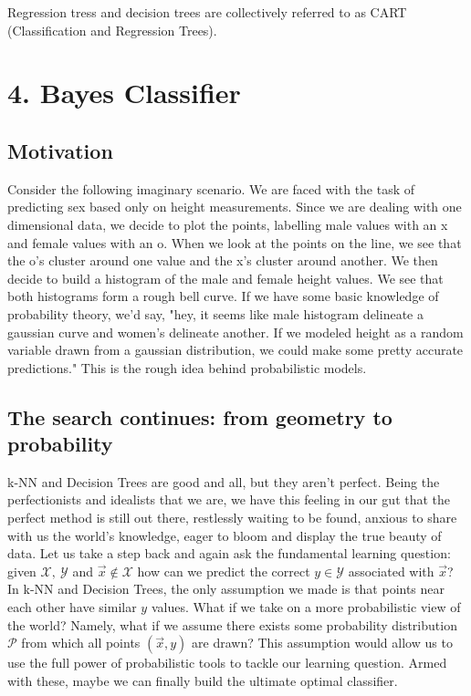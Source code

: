 \documentclass[10pt]{article}
\begin{document}
		\noindent Regression tress and decision trees are collectively referred to as CART 
		(Classification and Regression Trees).
		
		
\section*{4. Bayes Classifier}
	\subsection*{Motivation}
		Consider the following imaginary scenario. We are faced with the task of predicting sex based only on height 
		measurements. Since we are dealing with one dimensional data, we decide to plot the points, labelling male 
		values with an x and female values with an o. When we look at the points on the line, we see that the o's cluster 
		around one value and the x's cluster around another. We then decide to build a histogram of the male and 
		female height values. We see that both histograms form a rough bell curve. If we have some basic knowledge 
		of probability theory, we'd say, "hey, it seems like male histogram delineate a gaussian curve and women's 
		delineate another. If we modeled height as a random variable drawn from a gaussian distribution, we could 
		make some pretty accurate predictions." This is the rough idea behind probabilistic models. 
		
	\subsection*{The search continues: from geometry to probability}
		k-NN and Decision Trees are good and all, but they aren't perfect. Being the perfectionists and idealists that we are, 
		we have this feeling in our gut that the perfect method is still out there, restlessly waiting to be found, anxious to
		share with us the world's knowledge, eager to bloom and display the true beauty of data. Let us take a step back and
		again ask the fundamental learning question: given $\mathcal X, \ \mathcal Y$ and $\vec x \not \in \mathcal X$ 
		how can we predict the correct $y \in \mathcal Y$ associated with $\vec x$? In k-NN and Decision Trees, the only
		assumption we made is that points near each other have similar $y$ 
		values. What if we take on a more probabilistic view of the world? Namely, what if we assume there exists some 
		probability distribution $\mathcal P$ from which all points $(\vec x, y)$ are drawn? This assumption would
		allow us to use the full power of probabilistic tools to tackle our learning question. Armed with these, maybe we
		can finally build the ultimate optimal classifier.
		
\end{document}
